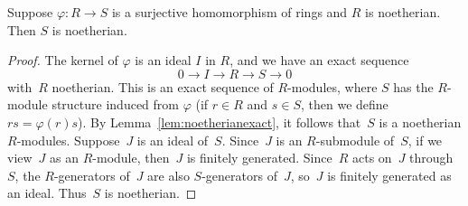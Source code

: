 \begin{lemma}\label{lem:surjnoetherian}
  Suppose $\varphi:R\to S$ is a surjective homomorphism of
  rings and $R$ is noetherian. Then $S$ is noetherian.
\end{lemma}
\begin{proof}
  The kernel of $\varphi$ is an ideal $I$ in $R$, and
  we have an exact sequence
  \[
    0 \to I \to R \to S \to 0
  \]
  with~$R$ noetherian.
  This is an exact sequence of $R$-modules, where $S$ has the
  $R$-module structure induced from $\varphi$ (if $r\in R$
  and $s\in S$, then we define $rs = \varphi(r)s$).
  By Lemma~\ref{lem:noetherianexact}, it follows
  that~$S$ is a noetherian $R$-modules. Suppose~$J$ is an ideal of~$S$.
  Since~$J$ is an $R$-submodule of~$S$, if we view~$J$ as an $R$-module,
  then~$J$ is finitely generated. Since~$R$ acts on~$J$ through~$S$,
  the $R$-generators of~$J$ are also $S$-generators of~$J$, so~$J$
  is finitely generated as an ideal. Thus~$S$ is noetherian.
\end{proof}

